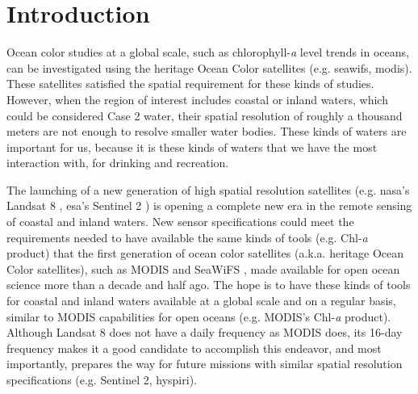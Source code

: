 \chapter{Introduction}
\label{ch:introduction} 


Ocean color studies at a global scale, such as chlorophyll-{\it a} level trends in oceans, can be investigated using the heritage Ocean Color satellites (e.g. \acrfull{seawifs}, \acrfull{modis}). These satellites satisfied the spatial requirement for these kinds of studies. However, when the region of interest includes coastal or inland waters, which could be considered Case 2 water, their spatial resolution of roughly a thousand meters are not enough to resolve smaller water bodies. These kinds of waters are important for us, because it is these kinds of waters that we have the most interaction with, for drinking and recreation. 

The launching of a new generation of high spatial resolution satellites (e.g. \acrshort{nasa}'s Landsat 8 \citep{Irons:2012}, \acrshort{esa}'s Sentinel 2 \citep{Malenovsky:2012}) is opening a complete new era in the remote sensing of coastal and inland waters. New sensor specifications could meet the requirements needed to have available the same kinds of tools (e.g. Chl-{\it a} product) that the first generation of ocean color satellites (a.k.a. heritage Ocean Color satellites), such as MODIS \citep{Esaias1998} and SeaWiFS \citep{McClain2004}, made available for open ocean science more than a decade and half ago. The hope is to have these kinds of tools for coastal and inland waters available at a global scale and on a regular basis, similar to MODIS capabilities for open oceans (e.g. MODIS's Chl-{\it a} product). Although Landsat 8 does not have a daily frequency as MODIS does, its 16-day frequency makes it a good candidate to accomplish this endeavor, and most importantly, prepares the way for future missions with similar spatial resolution specifications (e.g. Sentinel 2, \acrfull{hyspiri}).

